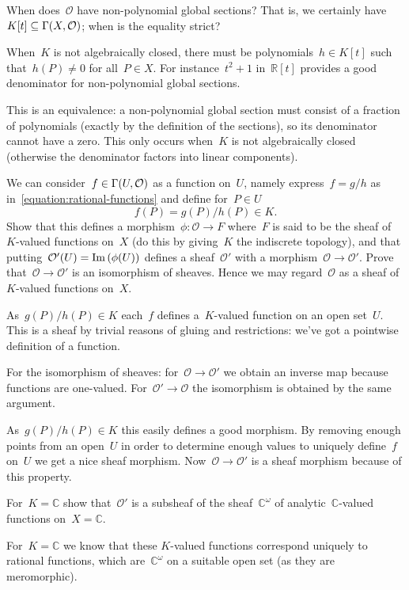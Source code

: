 \documentclass[a4paper,11pt,oneside,openany,article]{memoir}
\begin{document}
\begin{enumerate}
    When does~$\mathcal{O}$ have non-polynomial global sections? That is, we certainly have~$K[t]\subseteq\mathrm{\Gamma}(X,\mathcal{O})$; when is the equality strict?

    \begin{solution}
      When~$K$ is not algebraically closed, there must be polynomials~$h\in K[t]$ such that~$h(P)\neq 0$ for all~$P\in X$. For instance~$t^2+1$ in~$\mathbb{R}[t]$ provides a good denominator for non-polynomial global sections.

      This is an equivalence: a non-polynomial global section must consist of a fraction of polynomials (exactly by the definition of the sections), so its denominator cannot have a zero. This only occurs when~$K$ is not algebraically closed (otherwise the denominator factors into linear components).
    \end{solution}

    We can consider~$f\in\mathrm{\Gamma}(U,\mathcal{O})$ as a function on~$U$, namely express~$f=g/h$ as in~\eqref{equation:rational-functions} and define for~$P\in U$
    \begin{equation}
      f(P)=g(P)/h(P)\in K.
    \end{equation}
    Show that this defines a morphism~$\phi\colon\mathcal{O}\to F$ where~$F$ is said to be the sheaf of~$K$\nobreakdash-valued functions on~$X$ (do this by giving~$K$ the indiscrete topology), and that putting~$\mathcal{O}'(U)=\operatorname{Im}\left( \phi(U) \right)$ defines a sheaf~$\mathcal{O}'$ with a morphism~$\mathcal{O}\to\mathcal{O}'$. Prove that~$\mathcal{O}\to\mathcal{O}'$ is an isomorphism of sheaves. Hence we may regard~$\mathcal{O}$ as a sheaf of~$K$\nobreakdash-valued functions on~$X$.

    \begin{solution}
      As~$g(P)/h(P)\in K$ each~$f$ defines a~$K$\nobreakdash-valued function on an open set~$U$. This is a sheaf by trivial reasons of gluing and restrictions: we've got a pointwise definition of a function.

      For the isomorphism of sheaves: for~$\mathcal{O}\to\mathcal{O}'$ we obtain an inverse map because functions are one-valued. For~$\mathcal{O}'\to\mathcal{O}$ the isomorphism is obtained by the same argument.

      As~$g(P)/h(P)\in K$ this easily defines a good morphism. By removing enough points from an open~$U$ in order to determine enough values to uniquely define~$f$ on~$U$ we get a nice sheaf morphism. Now~$\mathcal{O}\to\mathcal{O}'$ is a sheaf morphism because of this property.
    \end{solution}

    For~$K=\mathbb{C}$ show that~$\mathcal{O}'$ is a subsheaf of the sheaf~$\mathbb{C}^\omega$ of analytic~$\mathbb{C}$\nobreakdash-valued functions on~$X=\mathbb{C}$.

    \begin{solution}
      For~$K=\mathbb{C}$ we know that these $K$\nobreakdash-valued functions correspond uniquely to rational functions, which are~$\mathbb{C}^\omega$ on a suitable open set (as they are meromorphic).
    \end{solution}
\end{enumerate}
\end{document}
